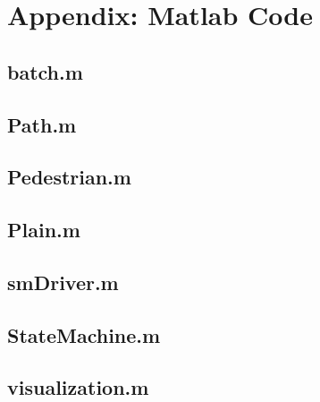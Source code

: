 \documentclass[a4paper, DIV11, abstracton]{scrartcl}
\begin{document}
%
%

\renewcommand{\refname}{\section{References}} %




\newpage
\section{Appendix: Matlab Code}
\subsection*{batch.m}

\subsection*{Path.m}

\subsection*{Pedestrian.m}

\subsection*{Plain.m}

\subsection*{smDriver.m}

\subsection*{StateMachine.m}

\subsection*{visualization.m}

\end{document}

